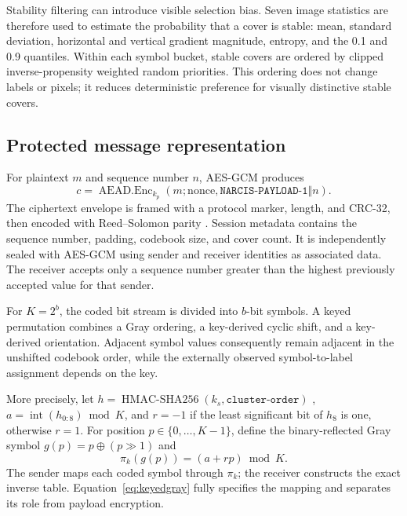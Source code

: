 ﻿\documentclass[a4paper,fleqn]{cas-dc}
\begin{document}
Stability filtering can introduce visible selection bias. Seven image
statistics are therefore used to estimate the probability that a cover is
stable: mean, standard deviation, horizontal and vertical gradient magnitude,
entropy, and the 0.1 and 0.9 quantiles. Within each symbol bucket, stable
covers are ordered by clipped inverse-propensity weighted random priorities.
This ordering does not change labels or pixels; it reduces deterministic
preference for visually distinctive stable covers.

\subsection{Protected message representation}

For plaintext $m$ and sequence number $n$, AES-GCM
\cite{nist2007gcm} produces
\begin{equation}
c=\operatorname{AEAD.Enc}_{k_p}(m;\mathrm{nonce},
\texttt{NARCIS-PAYLOAD-1}\Vert n).
\end{equation}
The ciphertext envelope is framed with a protocol marker, length, and CRC-32,
then encoded with Reed--Solomon parity \cite{reed1960polynomial}. Session metadata contains the sequence
number, padding, codebook size, and cover count. It is independently sealed
with AES-GCM using sender and receiver identities as associated data. The
receiver accepts only a sequence number greater than the highest previously
accepted value for that sender.

For $K=2^b$, the coded bit stream is divided into $b$-bit symbols. A keyed
permutation combines a Gray ordering, a key-derived cyclic shift, and a
key-derived orientation. Adjacent symbol values consequently remain adjacent
in the unshifted codebook order, while the externally observed symbol-to-label
assignment depends on the key.

More precisely, let
$h=\operatorname{HMAC\mbox{-}SHA256}(k_s,\texttt{cluster-order})$
\cite{nist2008hmac},
$a=\operatorname{int}(h_{0:8})\bmod K$, and
$r=-1$ if the least significant bit of $h_8$ is one, otherwise $r=1$.
For position $p\in\{0,\ldots,K-1\}$, define the binary-reflected Gray symbol
$g(p)=p\oplus(p\!\gg\!1)$ and
\begin{equation}
\pi_k(g(p))=(a+rp)\bmod K.
\label{eq:keyedgray}
\end{equation}
The sender maps each coded symbol through $\pi_k$; the receiver constructs
the exact inverse table. Equation~\eqref{eq:keyedgray} fully specifies the
mapping and separates its role from payload encryption.
\end{document}
